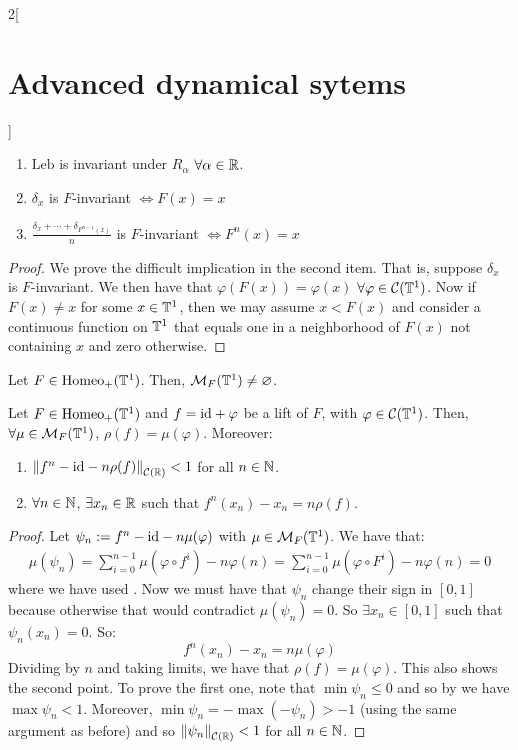 \documentclass[../../../main_math.tex]{subfiles}
\begin{document}
\begin{multicols}{2}[\section{Advanced dynamical sytems}]
\begin{proposition}
    \begin{enumerate}
      \item $\text{Leb}$ is invariant under $R_\alpha$ $\forall \alpha\in\mathbb{R}$.
      \item $\delta_x$ is $F$-invariant $\iff F(x)=x$
      \item $\displaystyle\frac{\delta_x+\cdots+\delta_{F^{n-1}(x)}}{n}$ is $F$-invariant $\iff F^n(x)=x$
    \end{enumerate}
  \end{proposition}
  \begin{proof}
    We prove the difficult implication in the second item. That is, suppose $\delta_x$ is $F$-invariant. We then have that $\varphi(F(x))=\varphi(x)$ $\forall \varphi\in \mathcal{C}(\mathbb{T}^1)$. Now if $F(x)\ne x$ for some $x\in \mathbb{T}^1$, then we may assume $x < F(x)$ and consider a continuous function on $\mathbb{T}^1$ that equals one in a neighborhood of $F(x)$ not containing $x$ and zero otherwise.
  \end{proof}
  \begin{theorem}
    Let $F\in\mathrm{Homeo}_+(\mathbb{T}^1)$. Then, $\mathcal{M}_F(\mathbb{T}^1)\ne\varnothing$.
  \end{theorem}
  \begin{proposition}
    Let $F\in\mathrm{Homeo}_+(\mathbb{T}^1)$ and $f=\mathrm{id}+\varphi$ be a lift of $F$, with $\varphi\in\mathcal{C}(\mathbb{T}^1)$. Then, $\forall\mu\in\mathcal{M}_F(\mathbb{T}^1)$, $\rho(f)=\mu(\varphi)$. Moreover:
    \begin{enumerate}
      \item $\left\|f^n-\mathrm{id} -n\rho(f)\right\|_{\mathcal{C}(\mathbb{R})}<1$ for all $n\in\mathbb{N}$.
      \item $\forall n\in\mathbb{N}$, $\exists x_n\in\mathbb{R}$ such that $f^n(x_n)-x_n=n\rho(f)$.
    \end{enumerate}
  \end{proposition}
  \begin{proof}
    Let $\psi_n:= f^n-\mathrm{id} -n\mu(\varphi)$ with $\mu\in\mathcal{M}_F(\mathbb{T}^1)$. We have that:
    \begin{multline*}
      \mu(\psi_n)=\sum_{i=0}^{n-1}\mu(\varphi\circ f^i)-n\varphi(n)=\sum_{i=0}^{n-1}\mu(\varphi\circ F^i)-n\varphi(n)=0
    \end{multline*}
    where we have used . Now we must have that $\psi_n$ change their sign in $[0,1]$ because otherwise that would contradict $\mu(\psi_n)=0$. So $\exists x_n\in[0,1]$ such that $\psi_n(x_n)=0$. So:
    $$
      f^n(x_n)-x_n=n\mu(\varphi)
    $$
    Dividing by $n$ and taking limits, we have that $\rho(f)=\mu(\varphi)$. This also shows the second point. To prove the first one, note that $\min\psi_n\leq 0$ and so by  we have $\max\psi_n <1$. Moreover, $\min\psi_n =-\max(-\psi_n) >-1$ (using the same argument as before) and so $\left\|\psi_n\right\|_{\mathcal{C}(\mathbb{R})}<1$ for all $n\in\mathbb{N}$.
  \end{proof}

\end{multicols}
\end{document}
